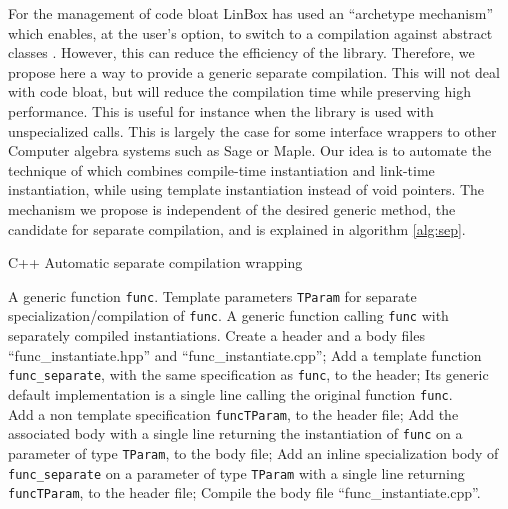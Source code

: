 \documentclass{article}
\newcommand{\linbox}{{\sc LinBox}\xspace}
\begin{document}
For the management of code bloat \linbox has used an ``archetype
mechanism'' which enables, at the user's option, to switch to a
compilation against abstract classes \cite[\S 2.1]{jgd:2002:icms}.
However, this can reduce the efficiency of the library. Therefore, we propose
here a way to provide a generic separate compilation. This will not
deal with code bloat, but will reduce the compilation time while
preserving high performance.
This is useful for instance when the library is used with
unspecialized calls. This is largely the case for some interface
wrappers to other Computer algebra systems such as {\sc Sage} or {\sc Maple}.
Our idea is to automate the technique of
\cite{Erlingsson:1996:issac} which combines compile-time instantiation
and link-time instantiation, while using template instantiation
instead of void pointers.
The mechanism we propose is independent of the desired generic method,
the candidate
for separate compilation, and is explained in algorithm \ref{alg:sep}.
\begin{algorithm}[ht]
\caption{C++ Automatic separate compilation wrapping}\label{alg:sep}
\begin{algorithmic}[1]
\REQUIRE A generic function \texttt{func}.
\REQUIRE Template parameters \texttt{TParam} for separate
specialization/compilation of \texttt{func}.
\ENSURE A generic function calling
\texttt{func} with separately compiled instantiations.
\STATE Create a header and a body files ``func\_instantiate.hpp'' and ``func\_instantiate.cpp'';
\STATE Add a template function \texttt{func\_separate}, with the same
specification as \texttt{func}, to the header;
\STATE Its generic default implementation is a single line calling the
original function \texttt{func}.\\ 
  \STATE Add  a non template specification
  \texttt{funcTParam}, to the header file;
  \STATE Add the associated body with a
  single line returning the instantiation of
  \texttt{func} on a parameter of type \texttt{TParam}, to the body file;
  \STATE Add an inline specialization
  body of \texttt{func\_separate} on a parameter of type
  \texttt{TParam} with a single line returning \texttt{funcTParam}, to
  the header file; 
\ENDFOR
\STATE Compile the body file ``func\_instantiate.cpp''.
\end{algorithmic}
\end{algorithm}
\end{document}
